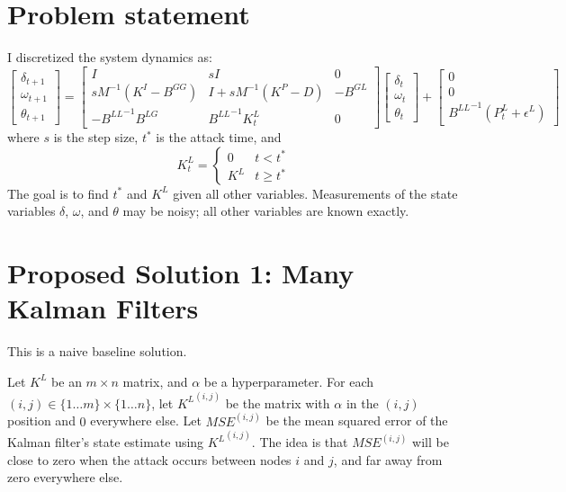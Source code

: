 \documentclass{article}
\begin{document}
\section*{Problem statement}
I discretized the system dynamics as:
\begin{equation}
\begin{bmatrix}
\delta_{t+1} \\
\omega_{t+1} \\
\theta_{t+1}
\end{bmatrix}
=
\begin{bmatrix}
I & sI & 0 \\
sM^{-1}(K^I-B^{GG}) & I + sM^{-1}(K^P-D) & -B^{GL} \\
-{B^{LL}}^{-1}B^{LG} & {B^{LL}}^{-1}K^L_t & 0
\end{bmatrix}
\begin{bmatrix}
\delta_{t} \\
\omega_{t} \\
\theta_{t}
\end{bmatrix}
+
\begin{bmatrix}
0 \\
0 \\
{B^{LL}}^{-1}(P^L_t + \epsilon^L)
\end{bmatrix}
\label{eq:sysdyn}
\end{equation}
where $s$ is the step size, $t^*$ is the attack time, and
\begin{equation}
K^L_t =
\begin{cases}
0   & t < t^* \\
K^L & t \ge t^*
\end{cases}
\end{equation}
The goal is to find $t^*$ and $K^L$ given all other variables.
Measurements of the state variables $\delta$, $\omega$, and $\theta$ may be noisy;
all other variables are known exactly.

\section*{Proposed Solution 1: Many Kalman Filters}

This is a naive baseline solution.

Let $K^L$ be an $m\times n$ matrix, and $\alpha$ be a hyperparameter.
For each $(i,j) \in \{1\dots m\}\times\{1\dots n\}$, let
${K^L}^{(i,j)}$ be the matrix with $\alpha$ in the $(i,j)$ position and $0$ everywhere else.
Let $MSE^{(i,j)}$ be the mean squared error of the Kalman filter's state estimate using ${K^L}^{(i,j)}$.
The idea is that $MSE^{(i,j)}$ will be close to zero when the attack occurs between nodes $i$ and $j$, and far away from zero everywhere else.
\end{document}
